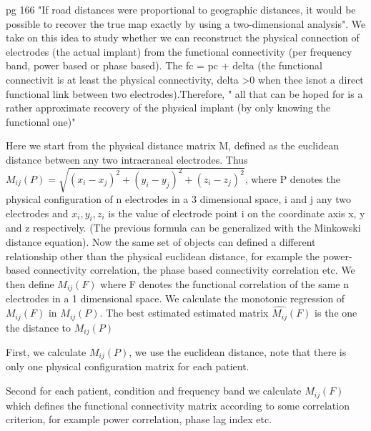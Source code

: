 \documentclass[11pt, onecolumn]{article}
\begin{document}
pg 166 "If road distances were proportional to geographic distances, it would be possible to recover the true map exactly by using a two-dimensional analysis". We take on this idea to study whether we can reconstruct the physical connection of electrodes (the actual implant) from the functional connectivity (per frequency band, power based or phase based). The fc = pc + delta (the functional connectivit is at least the physical connectivity, delta >0 when thee isnot a direct functional link between two electrodes).Therefore, "
all that can be hoped for is a rather approximate recovery of the
physical implant (by only knowing the functional one)" \citep{manly_multivariate_2004}


Here we start from the physical distance matrix M, defined as the euclidean distance between any two intracraneal electrodes. Thus $M_{ij}(P) = \sqrt{(x_i - x_j)^2 + (y_i - y_j)^2 + (z_i - z_j)^2}$, where P denotes the physical configuration of n electrodes in a 3 dimensional space, i and j any two electrodes and $x_i,y_i,z_i$ is the
value of electrode point i on the coordinate axis x, y and z respectively. (The previous formula can be generalized with the Minkowski distance equation).
Now the same set of objects can defined a different relationship other than the physical euclidean distance, for example the power-based connectivity correlation, the phase based connectivity correlation etc. We then define $M_{ij}(F)$  where F denotes the functional correlation of the same n electrodes in a 1 dimensional space.
We calculate the monotonic regression of $M_{ij}(F)$ in $M_{ij}(P)$. The best estimated  estimated matrix $\hat{M_{ij}}(F)$ is the one the distance to $M_{ij}(P)$

First, we calculate $M_{ij}(P)$, we use the euclidean distance, note that there is only one physical configuration matrix for each patient.

Second for each patient, condition and frequency band we calculate $M_{ij}(F)$ which defines the functional connectivity matrix according to some correlation criterion, for example power correlation, phase lag index etc.
\end{document}

